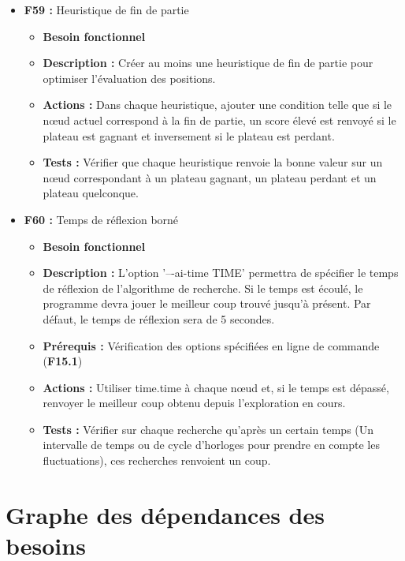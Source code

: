 \documentclass{article}
\begin{document}
\begin{itemize}
\begin{itemize}
\begin{itemize}
\begin{itemize}
                \item \textbf{Tests :} 
            \end{itemize} 
        \end{itemize}
    \end{itemize}
\bigskip
    \item \textbf{F59 :} Heuristique de fin de partie
    \begin{itemize}
        \item \textbf{Besoin fonctionnel}
        \item \textbf{Description :} Créer au moins une heuristique de fin de partie pour optimiser l’évaluation des positions.
        \item \textbf{Actions :} Dans chaque heuristique, ajouter une condition telle que si le nœud actuel correspond à la fin de partie, un score élevé est renvoyé si le plateau est gagnant et inversement si le plateau est perdant.
        \item \textbf{Tests :} Vérifier que chaque heuristique renvoie la bonne valeur sur un nœud correspondant à un plateau gagnant, un plateau perdant et un plateau quelconque.
    \end{itemize}
\mbox{}
    \item \textbf{F60 :} Temps de réflexion borné
    \begin{itemize}
        \item \textbf{Besoin fonctionnel}
        \item \textbf{Description :} L’option ’–-ai-time TIME’ permettra de spécifier le temps de réflexion de l’algorithme de recherche. Si le temps est écoulé, le programme devra jouer le meilleur coup trouvé jusqu’à présent. Par défaut, le temps de réflexion sera de 5 secondes.
        \item \textbf{Prérequis :} Vérification des options spécifiées en ligne de commande (\textbf{F15.1})
        \item \textbf{Actions :} Utiliser time.time à chaque nœud et, si le temps est dépassé, renvoyer le meilleur coup obtenu depuis l’exploration en cours.
        \item \textbf{Tests :} Vérifier sur chaque recherche qu’après un certain temps (Un intervalle de temps ou de cycle d’horloges pour prendre en compte les fluctuations), ces recherches renvoient un coup.
    \end{itemize}
\end{itemize}

\newpage
\section{Graphe des dépendances des besoins}
\end{document}
